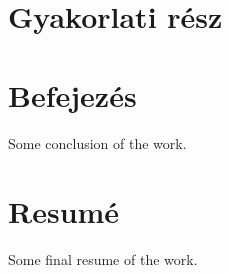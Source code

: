 \documentclass[a4paper,oneside,onecolumn,12pt]{LegrandOrangeBook}
\begin{document}

\chapter{Gyakorlati rész}

\chapter*{Befejezés}
Some conclusion of the work.

\pagebreak

\chapter*{Resumé}
Some final resume of the work.


\pagebreak
\thispagestyle{empty}

\mbox{}
\vfill

\end{document}
